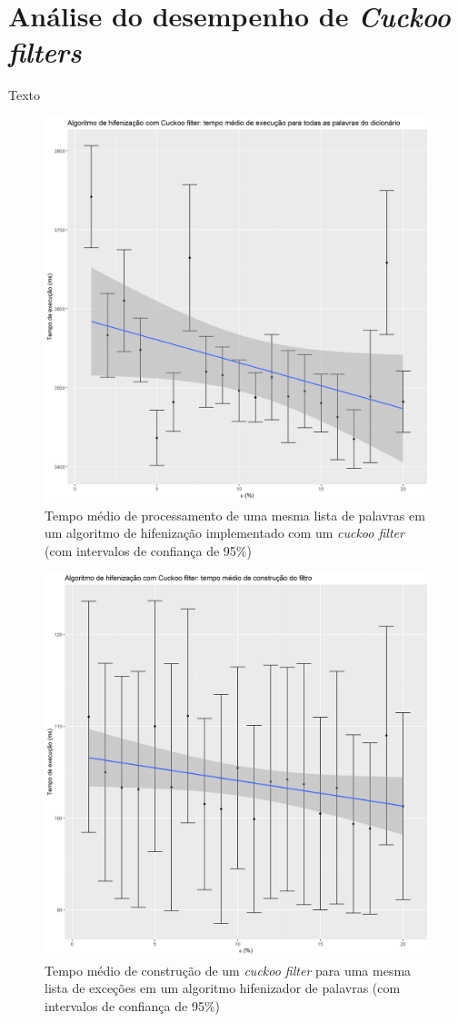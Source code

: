 \documentclass[12pt,twoside,english,brazilian]{book}
\begin{document}
\section{Análise do desempenho de \textit{Cuckoo filters}}

Texto

\begin{figure}
    \begin{center}
        \includegraphics[width=0.8\linewidth]{img/cuckoo-filter.png}
        \caption{\label{cuckoo-filter} Tempo médio de processamento de uma mesma lista de palavras em um algoritmo de hifenização implementado com um \textit{cuckoo filter} (com intervalos de confiança de 95\%)}
    \end{center}
\end{figure}

\begin{figure}
    \begin{center}
        \includegraphics[width=0.8\linewidth]{img/build-cuckoo-filter.png}
        \caption{\label{build-cuckoo-filter} Tempo médio de construção de um \textit{cuckoo filter} para uma mesma lista de exceções em um algoritmo hifenizador de palavras (com intervalos de confiança de 95\%)}
    \end{center}
\end{figure}
\end{document}
